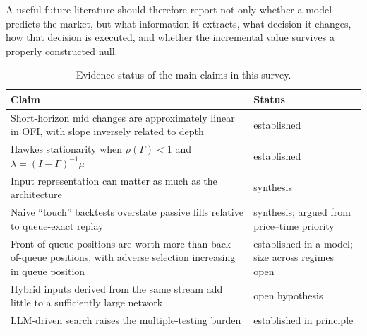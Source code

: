 A useful future literature should therefore report not only whether a model predicts the market,
but what information it extracts, what decision it changes, how that decision is executed, and
whether the incremental value survives a properly constructed null.

\begin{table}[!htbp]
\centering\small
\caption{Evidence status of the main claims in this survey.}
\label{tab:evidence}
\begin{tabularx}{\linewidth}{Xl}
\toprule
Claim & Status \\
\midrule
Short-horizon mid changes are approximately linear in OFI, with slope inversely related to
  depth~\citep{cks2014} & established \\
Hawkes stationarity when $\rho(\Gamma) < 1$ and $\bar\lambda = (I-\Gamma)^{-1}\mu$ & established \\
Input representation can matter as much as the architecture & synthesis \\
Naive ``touch'' backtests overstate passive fills relative to queue-exact replay & synthesis;
  argued from price--time priority \\
Front-of-queue positions are worth more than back-of-queue positions, with adverse selection
  increasing in queue position~\citep{moallemi2017} & established in a model; size across regimes open \\
Hybrid inputs derived from the same stream add little to a sufficiently large network & open
  hypothesis \\
LLM-driven search raises the multiple-testing burden & established in principle \\
\bottomrule
\end{tabularx}
\end{table}

